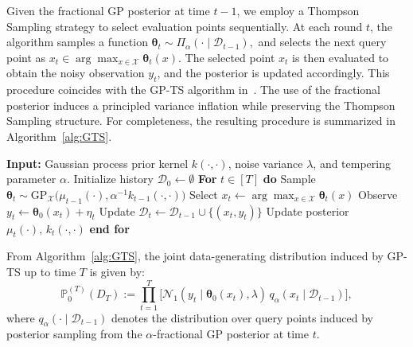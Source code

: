 \documentclass[final,12pt]{colt2026} %
\begin{document}
Given the fractional GP posterior at time $t-1$, we employ a Thompson Sampling strategy to select evaluation points sequentially. At each round $t$, the algorithm samples a function
\(
\pmb\theta_t \sim \Pi_{\alpha}(\cdot \mid \mathcal{D}_{t-1}),
\)
and selects the next query point as
\(
x_t \in \arg\max_{x \in \mathcal{X}} \pmb\theta_t(x).
\)
The selected point $x_t$ is then evaluated to obtain the noisy observation $y_t$, and the posterior is updated accordingly.
This procedure coincides with the GP-TS algorithm in~\cite{Ray&Gopalan2017}. The use of the fractional posterior induces a principled variance inflation while preserving the Thompson Sampling structure. For completeness, the resulting procedure is summarized in Algorithm~\ref{alg:GTS}.
\begin{algorithm}
\caption{Gaussian Process Thompson Sampling (GP-TS) with variance inflation}
\label{alg:GTS}
\begin{algorithmic}
\State \textbf{Input:} Gaussian process prior kernel $k(\cdot,\cdot)$, noise variance $\lambda$, and tempering parameter $\alpha$.
%
\State Initialize history $\mathcal{D}_0 \gets \emptyset$
%
\State \textbf{For} $t \in [T]$ \textbf{do}
%
\State \hspace{1em} Sample $\pmb\theta_t \sim \mathrm{GP}_{\mathcal X}\big(\mu_{t-1}(\cdot), \alpha^{-1}k_{t-1}(\cdot,\cdot)\big)$
%
\State \hspace{1em} Select $x_t \gets \arg\max_{x \in \mathcal X} \pmb \theta_t(x)$
%
\State \hspace{1em} Observe $y_t \gets \pmb\theta_0(x_t) + \eta_t$
%
\State \hspace{1em} Update $\mathcal{D}_t \gets \mathcal{D}_{t-1} \cup \{(x_t,y_t)\}$
%
\State \hspace{1em} Update posterior $\mu_t(\cdot),\, k_t(\cdot,\cdot)$
%
\State \textbf{end for}
\end{algorithmic}
\end{algorithm}

From Algorithm~\ref{alg:GTS}, the joint data-generating distribution induced by GP-TS up to time $T$ is given by:
\[
\mathbb{P}_0^{(T)}(D_T)
:=
\prod_{t=1}^{T}
\bigl[
\mathcal{N}_1(y_t \mid \pmb\theta_0(x_t),\lambda)\,
q_{\alpha}(x_t \mid \mathcal{D}_{t-1})
\bigr],
\]
where $q_{\alpha}(\cdot \mid \mathcal{D}_{t-1})$ denotes the distribution over query points induced by posterior sampling from the $\alpha$-fractional GP posterior at time $t$. 
\end{document}
